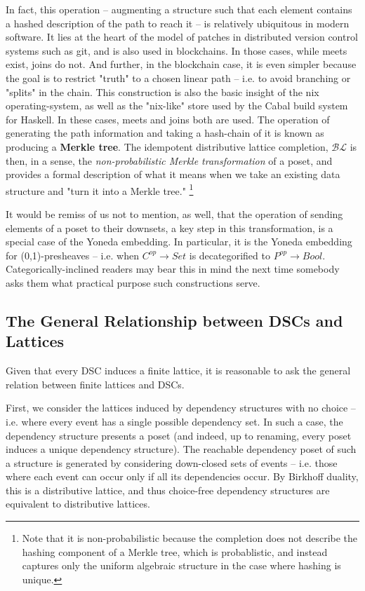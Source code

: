 \documentclass[hoptionsi,review,format=acmsmall]{acmart}
\theoremstyle{definition}
\newcommand{\BLc}{\mathcal{BL}}
\begin{document}
In fact, this operation -- augmenting a structure such that each element contains a hashed description of the path to reach it -- is relatively ubiquitous in modern software. It lies at the heart of the model of patches in distributed version control systems such as git, and is also used in blockchains. In those cases, while meets exist, joins do not. And further, in the blockchain case, it is even simpler because the goal is to restrict "truth" to a chosen linear path -- i.e. to avoid branching or "splits" in the chain. This construction is also the basic insight of the nix operating-system, as well as the "nix-like" store used by the Cabal build system for Haskell. In these cases, meets and joins both are used. The operation of generating the path information and taking a hash-chain of it is known as producing a \textbf{Merkle tree}\cite{merkle1987digital}. The idempotent distributive lattice completion, \(\BLc\) is then, in a sense,  the \textit{non-probabilistic Merkle transformation} of a poset, and provides a formal description of what it means when we take an existing data structure and "turn it into a Merkle tree." \footnote{Note that it is non-probabilistic because the completion does not describe the hashing component of a Merkle tree, which is probablistic, and instead captures only the uniform algebraic structure in the case where hashing is unique.}

It would be remiss of us not to mention, as well, that the operation of sending elements of a poset to their downsets, a key step in this transformation, is a special case of the Yoneda embedding. In particular, it is the Yoneda embedding for (0,1)-presheaves -- i.e. when \(C^{op} \rightarrow Set\) is decategorified to \(P^{op} \rightarrow Bool\). Categorically-inclined readers may bear this in mind the next time somebody asks them what practical purpose such constructions serve.


\subsection{The General Relationship between DSCs and Lattices}
Given that every DSC induces a finite lattice, it is reasonable to ask the general relation between finite lattices and DSCs. 

First, we consider the lattices induced by dependency structures with no choice -- i.e. where every event has a single possible dependency set. In such a case, the dependency structure presents a poset (and indeed, up to renaming, every poset induces a unique dependency structure). The reachable dependency poset of such a structure is generated by considering down-closed sets of events -- i.e. those where each event can occur only if all its dependencies occur. By Birkhoff duality, this is a distributive lattice, and thus choice-free dependency structures are equivalent to distributive lattices.
\end{document}
